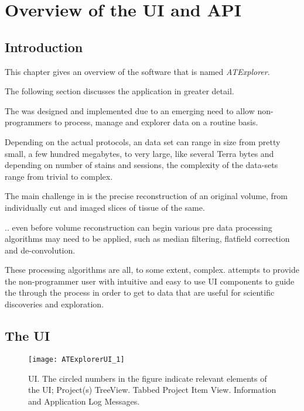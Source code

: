 
\chapter{Overview of the \ate{} UI and API}
\section{Introduction}

\doublespacing
This chapter gives an overview of the software that is named \emph{ATExplorer}.

The following section discusses the application in greater detail.

The \ate was designed and implemented due to an emerging need to allow non-programmers to process, manage and explorer \at data on a routine basis.

Depending on the actual protocols, an \at data set can range in size from pretty small, a few hundred megabytes, to very large, like several Terra bytes and depending on number of stains and sessions, the complexity of the data-sets range from trivial to complex.

The main challenge in \at is the precise reconstruction of an original volume, from individually cut and imaged slices of tissue of the same.

.. even before volume reconstruction can begin various pre data processing algorithms may need to be applied, such as median filtering, flatfield correction and de-convolution.

These processing algorithms are all, to some extent, complex. \ate attempts to provide the non-programmer user with intuitive and easy to use UI components to guide the through the process in order to get to data that are useful for scientific discoveries and exploration.

\clearpage

\section{The \ate UI}

\begin{figure}[h]
\centering\texttt{[image: ATExplorerUI\_1]}

\caption{\ate{} UI. The circled numbers in the figure indicate relevant elements of the UI; \protect{} Project(s) TreeView. \protect{} Tabbed Project Item View. \protect{} Information and Application Log Messages.}
\end{figure}


